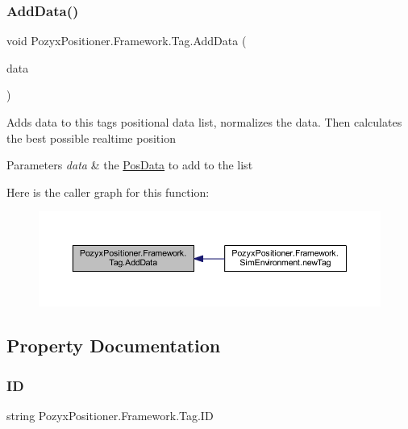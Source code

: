 \subsubsection{\texorpdfstring{Add\+Data()}{AddData()}}
{\footnotesize\ttfamily void Pozyx\+Positioner.\+Framework.\+Tag.\+Add\+Data (\begin{DoxyParamCaption}\item[{\hyperlink{struct_pozyx_positioner_1_1_framework_1_1_pos_data}{Pos\+Data}}]{data }\end{DoxyParamCaption})}



Adds data to this tag\textquotesingle{}s positional data list, normalizes the data. Then calculates the best possible realtime position 


\begin{DoxyParams}{Parameters}
{\em data} & the \hyperlink{struct_pozyx_positioner_1_1_framework_1_1_pos_data}{Pos\+Data} to add to the list\\
\hline
\end{DoxyParams}
Here is the caller graph for this function\+:\nopagebreak
\begin{figure}[H]
\begin{center}
\leavevmode
\includegraphics[width=350pt]{class_pozyx_positioner_1_1_framework_1_1_tag_ac2741e137c420ad71f64ee2d3d5fefe8_icgraph}
\end{center}
\end{figure}


\subsection{Property Documentation}
\mbox{\label{class_pozyx_positioner_1_1_framework_1_1_tag_a0d75eeca4dea7088e2b4a60230c13012}} 
\subsubsection{\texorpdfstring{ID}{ID}}
{\footnotesize\ttfamily string Pozyx\+Positioner.\+Framework.\+Tag.\+ID\hspace{0.3cm}{\ttfamily [get]}}



